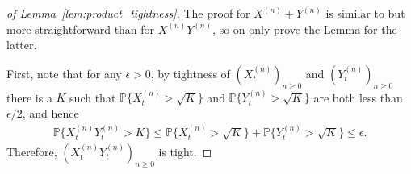 \documentclass[EJP]{ejpecp} %
\newcommand{\IP}{\mathbb P}
\begin{document}
\begin{proof}[of Lemma~\ref{lem:product_tightness}]
    The proof for $X^{(n)} + Y^{(n)}$ is similar to but more straightforward than
    for $X^{(n)} Y^{(n)}$, so on only prove the Lemma for the latter.

    First, note that for any $\epsilon > 0$, by tightness of $(X^{(n)}_t)_{n\ge0}$ and $(Y^{(n)}_t)_{n\ge0}$
    there is a $K$ such that
    $\IP\{ X^{(n)}_t > \sqrt{K} \}$ and $\IP\{ Y^{(n)}_t > \sqrt{K} \}$
    are both less than $\epsilon/2$,
    and hence
    \begin{align*}
        \IP\{
            X^{(n)}_t Y^{(n)}_t > K
        \}
        \le
        \IP\{
            X^{(n)}_t > \sqrt{K}
        \}
        +
        \IP\{
            Y^{(n)}_t > \sqrt{K}
        \} 
        \le \epsilon.
    \end{align*}
    Therefore, $(X^{(n)}_t Y^{(n)}_t)_{n \ge 0}$ is tight.


\end{proof}
\end{document}
